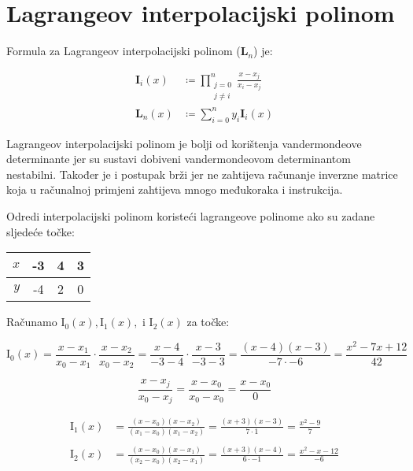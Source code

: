 \section{Lagrangeov interpolacijski polinom}

Formula za Lagrangeov interpolacijski polinom (${\mathbf L}_n$) je:

\begin{align}
    {\mathbf I}_i(x) &\coloneq \prod_{\substack{j=0\\j\neq i}}^{n} \frac{x-x_j}{x_i-x_j}\\
    {\mathbf L}_n(x) &\coloneq \sum_{i=0}^{n} y_i\mathbf{I}_i(x)
\end{align}

Lagrangeov interpolacijski polinom je bolji od korištenja vandermondeove determinante jer su sustavi dobiveni vandermondeovom determinantom nestabilni.
Također je i postupak brži jer ne zahtijeva računanje inverzne matrice koja u računalnoj primjeni zahtijeva mnogo međukoraka i instrukcija.

\begin{example}
    Odredi interpolacijski polinom koristeći lagrangeove polinome ako su zadane sljedeće točke:

    \center
    \begin{tabular}{r|c|c|c}
        $x$&-3&4&3\\
        \hline
        $y$&-4&2&0\\
    \end{tabular}
\end{example}

Računamo $\mathrm{I}_0(x), \mathrm{I}_1(x),$ i $\mathrm{I}_2(x)$ za točke:

$$
\mathrm{I}_0(x) = \frac{x-x_1}{x_0-x_1} \cdot \frac{x-x_2}{x_0-x_2} = \frac{x-4}{-3-4} \cdot \frac{x-3}{-3-3} = \frac{(x-4)(x-3)}{-7\cdot-6} = \frac{x^2-7x+12}{42}
$$

\begin{warningbox}
    $$
    \frac{x-x_j}{x_0-x_j}=\frac{x-x_0}{x_0-x_0}=\frac{x-x_0}{0}
    $$
\end{warningbox}

\begin{align*}
\mathrm{I}_1(x) &= \frac{(x-x_0)(x-x_2)}{(x_1-x_0)(x_1-x_2)} = \frac{(x+3)(x-3)}{7\cdot1} = \frac{x^2-9}{7}\\\\
\mathrm{I}_2(x) &= \frac{(x-x_0)(x-x_1)}{(x_2-x_0)(x_2-x_1)} = \frac{(x+3)(x-4)}{6\cdot-1} = \frac{x^2-x-12}{-6}
\end{align*}

